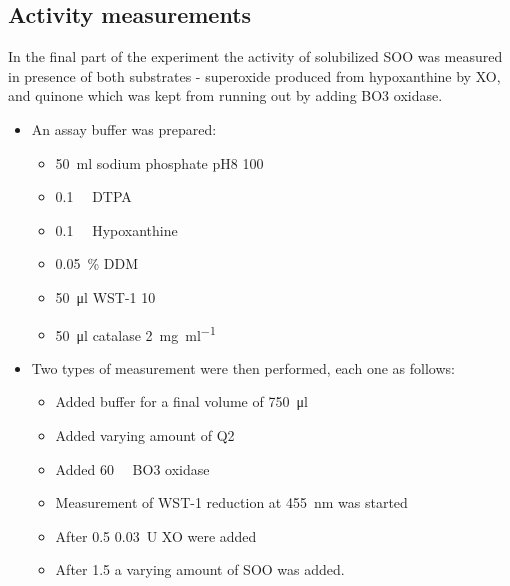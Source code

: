 \subsection{Activity measurements}

In the final part of the experiment the activity of solubilized SOO was
measured in presence of both substrates - superoxide produced from hypoxanthine
by XO, and quinone which was kept from running out by adding BO3 oxidase.

\begin{itemize}
	\item An assay buffer was prepared:
		\begin{itemize}
			\item \SI{50}{\ml} sodium phosphate pH8 \SI{100}{\milli\Molar}
			\item \SI{0.1}{\milli\Molar} DTPA
			\item \SI{0.1}{\milli\Molar} Hypoxanthine
			\item \SI{0.05}{\percent} DDM
			\item \SI{50}{\ul} WST-1 \SI{10}{\milli\Molar}
			\item \SI{50}{\ul} catalase \SI{2}{\mg\per\ml}
		\end{itemize}

	\item Two types of measurement were then performed, each one as follows:
		\begin{itemize}
			\item Added buffer for a final volume of \SI{750}{\ul}
			\item Added varying amount of Q2
			\item Added \SI{60}{\nano\Molar} BO3 oxidase
			\item Measurement of WST-1 reduction at \SI{455}{\nm} was started
			\item After \SI{0.5}{\min} \SI{0.03}{U} XO were added
			\item After \SI{1.5}{\min} a varying amount of SOO was added.
		\end{itemize}


\end{itemize}
